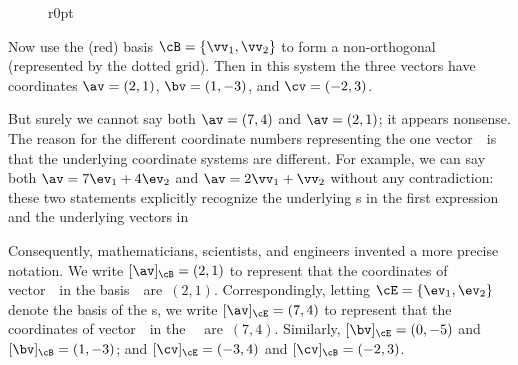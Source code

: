 \begin{example}
\begin{figure}r{0pt}
\end{figure}
Now use the (red) basis \(\cB=\{\vv_1,\vv_2\}\) to form a non-orthogonal  (represented by the dotted grid).
Then in this system the three vectors have coordinates \(\av=(2,1)\), \(\bv=(1,-3)\), and \(\cv=(-2,3)\).


But surely we cannot say both \(\av=(7,4)\) and \(\av=(2,1)\); it appears nonsense.
The reason for the different coordinate numbers representing the one vector~\av\ is that the underlying coordinate systems are different.
For example, we can say both \(\av=7\ev_1+4\ev_2\) 
and \(\av=2\vv_1+\vv_2\) without any contradiction: these 
two statements explicitly recognize the underlying s in the first expression and the underlying  vectors in 

Consequently, mathematicians, scientists, and engineers invented a more precise notation.
We write \([\av]_\cB=(2,1)\) to represent that the coordinates of vector~\av\ in the basis~\cB\ are~\((2,1)\).
Correspondingly, letting \(\cE=\{\ev_1,\ev_2\}\) denote the basis of the s, we write \([\av]_\cE=(7,4)\) to represent that the coordinates of vector~\av\ in the ~\cE\ are~\((7,4)\).
Similarly, \([\bv]_\cE=(0,-5)\) and \([\bv]_\cB=(1,-3)\);
and \([\cv]_\cE=(-3,4)\) and \([\cv]_\cB=(-2,3)\).


\end{example}
